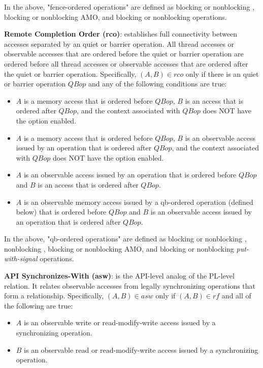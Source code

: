 In the above, "fence-ordered operations" are defined as blocking or nonblocking \PUT{},
    blocking or nonblocking \ac{AMO}, and blocking or nonblocking 
    operations.

\textbf{Remote Completion Order (rco)}:
\relRCO{} establishes full connectivity between accesses separated by an \openshmem
    quiet or barrier operation. All thread accesses or observable accesses that are
    \relHB{} ordered before the quiet or barrier operation are ordered before all thread
    accesses or observable accesses that are \relHB{} ordered after the quiet or barrier
    operation. Specifically, $(A, B) \in rco$ only if there is an \openshmem quiet or
    barrier operation $QBop$ and any of the following conditions are true:
\begin{itemize}
    \item $A$ is a memory access that is \relHB{} ordered before $QBop$, $B$ is an
        access that is \relHB{} ordered after $QBop$, and the context associated with
        $QBop$ does NOT have the  option enabled.
    \item $A$ is a memory access that is \relHB{} ordered before $QBop$, $B$ is an
        observable access issued by an operation that is \relHB{} ordered after $QBop$,
        and the context associated with $QBop$ does NOT have the
         option enabled.
    \item $A$ is an observable access issued by an operation that is \relHB{} ordered
        before $QBop$ and $B$ is an access that is \relHB{} ordered after $QBop$.
    \item $A$ is an observable memory access issued by a qb-ordered operation (defined
        below) that is \relHB{} ordered before $QBop$ and $B$ is an observable access
        issued by an operation that is \relHB{} ordered after $QBop$.
\end{itemize}

In the above, "qb-ordered operations" are defined as blocking or nonblocking \PUT{},
    nonblocking \GET{}, blocking or nonblocking \ac{AMO}, and blocking or nonblocking
    \emph{put-with-signal} operations.

\textbf{API Synchronizes-With (asw)}:
\relASW{} is the API-level analog of the PL-level \relSW{} relation. It relates
    observable accesses from legally synchronizing \openshmem operations that form a
    \relRF{} relationship. Specifically, $(A, B) \in asw$ only if $(A, B) \in rf$ and
    all of the following are true:
\begin{itemize}
    \item $A$ is an observable write or read-modify-write access issued by a
        synchronizing \openshmem operation.
    \item $B$ is an observable read or read-modify-write access issued by a
        synchronizing \openshmem operation.
\end{itemize}

